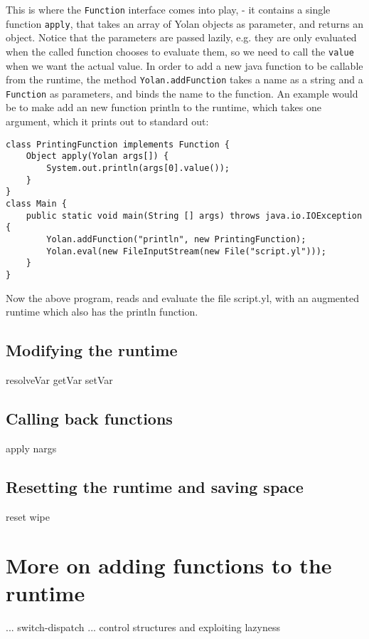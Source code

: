 This is where the \verb|Function| interface comes into play, - it contains a single function \verb|apply|, that takes an array of Yolan objects as parameter, and returns an object.
Notice that the parameters are passed lazily, e.g. they are only evaluated when the called function chooses to evaluate them, so we need to call the \verb|value| when we want the actual value.
In order to add a new java function to be callable from the runtime, the method \verb|Yolan.addFunction| takes a name as a string and a \verb|Function| as parameters, and binds the name to the function. An example would be to make add an new function println to the runtime, which takes one argument, which it prints out to standard out:
{\scriptsize 
\begin{verbatim}
class PrintingFunction implements Function {
    Object apply(Yolan args[]) {
        System.out.println(args[0].value());
    }
}
class Main {
    public static void main(String [] args) throws java.io.IOException {
        Yolan.addFunction("println", new PrintingFunction);
        Yolan.eval(new FileInputStream(new File("script.yl")));
    }
}
\end{verbatim}
}
Now the above program, reads and evaluate the file script.yl, with an augmented runtime which also has the println function.

\subsection{Modifying the runtime}
resolveVar getVar setVar
\subsection{Calling back functions}
apply nargs
\subsection{Resetting the runtime and saving space}
reset wipe

\section{More on adding functions to the runtime}
... switch-dispatch
... control structures and exploiting lazyness

